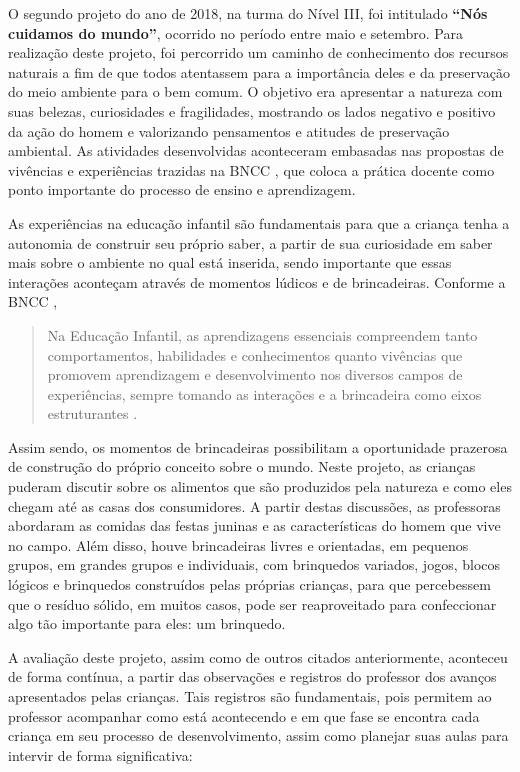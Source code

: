 \begin{refsection}
    O segundo projeto do ano de 2018, na turma do Nível III, foi intitulado \textbf{“Nós cuidamos do mundo”}, ocorrido no período entre maio e setembro. Para realização deste projeto, foi percorrido um caminho de conhecimento dos recursos naturais a fim de que todos atentassem para a importância deles e da preservação do meio ambiente para o bem comum. O objetivo era apresentar a natureza com suas belezas, curiosidades e fragilidades, mostrando os lados negativo e positivo da ação do homem e valorizando pensamentos e atitudes de preservação ambiental. As atividades desenvolvidas aconteceram embasadas nas propostas de vivências e experiências trazidas na BNCC \cite{BaNacCurEF2017}, que coloca a prática docente como ponto importante do processo de ensino e aprendizagem. 

    As experiências na educação infantil são fundamentais para que a criança tenha a autonomia de construir seu próprio saber, a partir de sua curiosidade em saber mais sobre o ambiente no qual está inserida, sendo importante que essas interações aconteçam através de momentos lúdicos e de brincadeiras. Conforme a BNCC \cite{BaNacCurEF2017}, 

    \begin{quotation}
        Na Educação Infantil, as aprendizagens essenciais compreendem tanto comportamentos, habilidades e conhecimentos quanto vivências que promovem aprendizagem e desenvolvimento nos diversos campos de experiências, sempre tomando as interações e a brincadeira como eixos estruturantes \cite[p.~42]{BaNacCurEF2017}.
    \end{quotation}

    Assim sendo, os momentos de brincadeiras possibilitam a oportunidade prazerosa de construção do próprio conceito sobre o mundo. Neste projeto, as crianças puderam discutir sobre os alimentos que são produzidos pela natureza e como eles chegam até as casas dos consumidores. A partir destas discussões, as professoras abordaram as comidas das festas juninas e as características do homem que vive no campo. Além disso, houve brincadeiras livres e orientadas, em pequenos grupos, em grandes grupos e individuais, com brinquedos variados, jogos, blocos lógicos e brinquedos construídos pelas próprias crianças, para que percebessem que o resíduo sólido, em muitos casos, pode ser reaproveitado para confeccionar algo tão importante para eles: um brinquedo.  

    A avaliação deste projeto, assim como de outros citados anteriormente, aconteceu de forma contínua, a partir das observações e registros do professor dos avanços apresentados pelas crianças. Tais registros são fundamentais, pois permitem ao professor acompanhar como está acontecendo e em que fase se encontra cada criança em seu processo de desenvolvimento, assim como planejar suas aulas para intervir de forma significativa:  


\end{refsection}
